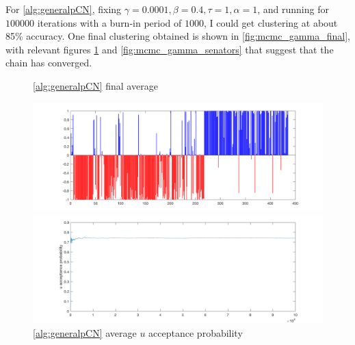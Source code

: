 \documentclass{siamart1116}
\begin{document}
    For \cref{alg:generalpCN}, fixing $\gamma = 0.0001, \beta = 0.4, \tau = 1, \alpha = 1$, and running for $100000$ iterations with a burn-in period of $1000$, I could get clustering at about 85\% accuracy. One final clustering obtained is shown in \cref{fig:mcmc_gamma_final}, with relevant figures \cref{fig:mcmc_gamma_acceptance} and \cref{fig:mcmc_gamma_senators} that suggest that the chain has converged.
    \begin{figure}[!htb]
    \begin{minipage}{0.48\textwidth}
        \caption{\label{fig:mcmc_gamma_final} \cref{alg:generalpCN} final average}
        \includegraphics[width = \linewidth]{voting/mcmc_gamma/final_avg.png}
    \end{minipage}\hfill
    \begin{minipage}{0.48\textwidth}
        \caption{\label{fig:mcmc_gamma_acceptance} \cref{alg:generalpCN} average $u$ acceptance probability}
        \includegraphics[width=\linewidth]{voting/mcmc_gamma/u_accept.png}
    \end{minipage}
    \end{figure}
\end{document}

